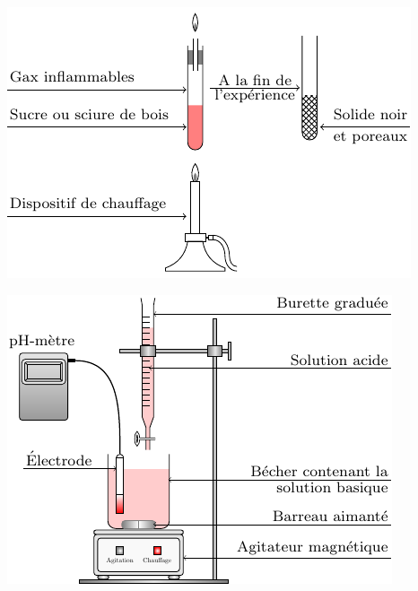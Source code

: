     \begin{minipage}{0.475\linewidth}\centering
            \includegraphics[width=\linewidth]{./TikZimages/TikZ2.pdf}
        \end{minipage}\hfill\begin{minipage}{0.475\linewidth}\centering
            \includegraphics[width=\linewidth]{./TikZimages/TikZ3.pdf}\\
    \end{minipage}

